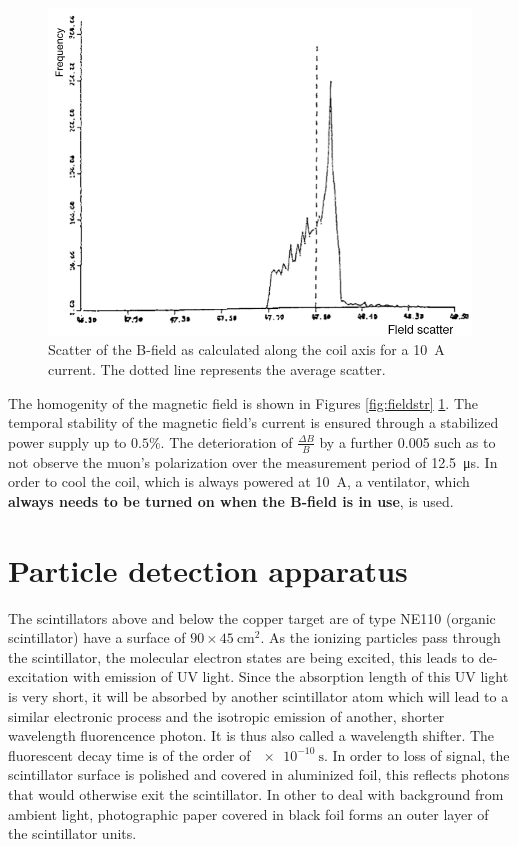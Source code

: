 \begin{figure}
\centering
 \includegraphics[width=\linewidth]{./fig/fieldscat.png}
\caption{Scatter of the B-field as calculated along the coil axis for a \SI{10}{\ampere} current. The dotted line represents the average scatter.}
\label{fig:fieldscat}
\end{figure}

The homogenity of the magnetic field is shown in Figures \ref{fig:fieldstr} \ref{fig:fieldscat}.
The temporal stability of the magnetic field's current is ensured through a stabilized power supply up to $0.5 \%$. The deterioration of $\frac{\Delta B}{B}$  by a further 0.005 such as to not observe the muon's polarization over the measurement period of \SI{12.5}{\micro\second}. In order to cool the coil, which is always powered at \SI{10}{\ampere}, a ventilator, which \textbf{always needs to be turned on when the B-field is in use}, is used.

\section{Particle detection apparatus}

The scintillators above and below the copper target are of type NE110 (organic scintillator) have a surface of $90 \times \SI{45}{\centi\meter\squared}$. As the ionizing particles pass through the scintillator, the molecular electron states are being excited, this leads to de-excitation with emission of UV light. Since the absorption length of this UV light is very short, it will be absorbed by another scintillator atom which will lead to a similar electronic process and the isotropic emission of another, shorter wavelength fluorencence photon. It is thus also called a wavelength shifter. The fluorescent decay time is of the order of $\SI{e-10}{\second}$. In order to loss of signal, the scintillator surface is polished and covered in aluminized foil, this reflects photons that would otherwise exit the scintillator. In other to deal with background from ambient light, photographic paper covered in black foil forms an outer layer of the scintillator units.

